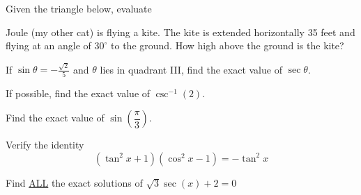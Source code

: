 \documentclass[addpoints]{exam}
\begin{document}
\begin{questions}


\question
Given the triangle below, evaluate
\begin{flushleft}

\end{flushleft}

\question[5] Joule (my other cat) is flying a kite. The kite is extended horizontally 35 feet and flying at an angle of $30^{\circ}$ to the ground.  How high above the ground is the kite?

\vfill

\question[5]  If $\sin \theta=-\frac{\sqrt{2}}{5}$ and $\theta$ lies in quadrant III, find the exact value of $\sec \theta$.

\vfill
\pagebreak
\question[3]  If possible, find the exact value of $\csc^{-1}(2)$.

\vfill

\question[3] Find the exact value of $\sin\left( \dfrac{\pi}{3} \right)$.

\vfill

\question[5] Verify the identity
$$\left(\tan^2 x+1\right)\left(\cos^2 x-1\right)= -\tan^2 x$$

\vfill
\vfill
\pagebreak
\question[5] Find \underline{ALL} the exact solutions of $\sqrt{3} \sec(x) +2=0$


\end{questions}
\end{document}
